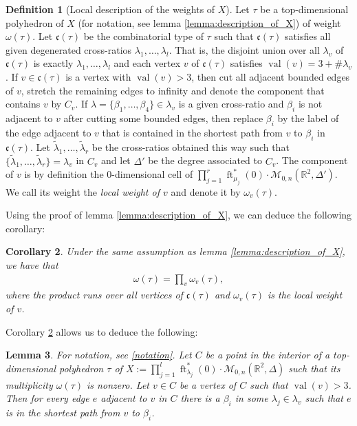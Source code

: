 \documentclass[11pt,reqno,a4]{amsart}
\theoremstyle{dotless}
\newtheorem{corollary}{Corollary}[section]
\newtheorem{lemma}[corollary]{Lemma}
\theoremstyle{definition}
\newtheorem{definition}[corollary]{Definition}
\newcommand{\ft}{\operatorname{ft}}
\newcommand{\val}{\operatorname{val}}
\begin{document}
\begin{definition}[Local description of the weights of $X$]\label{definition:resolution_weights_local}
Let $\tau$ be a top-dimensional polyhedron of $X$ (for notation, see lemma \ref{lemma:description_of_X}) of weight $\omega(\tau)$. Let $\mathfrak{c}(\tau)$ be the combinatorial type of $\tau$ such that $\mathfrak{c}(\tau)$ satisfies all given degenerated cross-ratios $\lambda_1,\dots,\lambda_l$. That is, the disjoint union over all $\lambda_v$ of $\mathfrak{c}(\tau)$ is exactly $\lambda_1,\dots,\lambda_l$ and each vertex $v$ of $\mathfrak{c}(\tau)$ satisfies $\val(v)=3+\#\lambda_v$. If $v\in\mathfrak{c}(\tau)$ is a vertex with $\val(v)>3$, then cut all adjacent bounded edges of $v$, stretch the remaining edges to infinity and denote the component that contains $v$ by $C_v$. If $\lambda=\lbrace \beta_1,\dots,\beta_4\rbrace\in\lambda_v$ is a given cross-ratio and $\beta_i$ is not adjacent to $v$ after cutting some bounded edges, then replace $\beta_i$ by the label of the edge adjacent to $v$ that is contained in the shortest path from $v$ to $\beta_i$ in $\mathfrak{c}(\tau)$. Let $\tilde{\lambda}_1,\dots,\tilde{\lambda}_r$ be the cross-ratios obtained this way such that $\lbrace \tilde{\lambda}_1,\dots,\tilde{\lambda}_r\rbrace=\lambda_v$ in $C_v$ and let $\Delta'$ be the degree associated to $C_v$. The component of $v$ is by definition the $0$-dimensional cell of $\prod_{j=1}^r \ft_{\mu_j}^*\left( 0\right)\cdot\mathcal{M}_{0,n}\left(\mathbb{R}^2,\Delta' \right)$. We call its weight the \textit{local weight of $v$} and denote it by $\omega_v(\tau)$. 
\end{definition}

Using the proof of lemma \ref{lemma:description_of_X}, we can deduce the following corollary:
\begin{corollary}\label{corollary:resolution_weights_local}
Under the same assumption as lemma \ref{lemma:description_of_X}, we have that
\begin{align*}
\omega(\tau)=\prod_v \omega_v(\tau),
\end{align*}
where the product runs over all vertices of $\mathfrak{c}(\tau)$ and $\omega_v(\tau)$ is the local weight of $v$.
\end{corollary}

Corollary \ref{corollary:resolution_weights_local} allows us to deduce the following:

\begin{lemma}\label{lemma:nice_property}
For notation, see \ref{notation}. Let $C$ be a point in the interior of a top-dimensional polyhedron $\tau$ of $X:=\prod_{j=1}^{l}\ft_{\lambda_j}^*\left( 0\right)\cdot\mathcal{M}_{0,n}\left(\mathbb{R}^2,\Delta \right)$ such that its multiplicity $\omega(\tau)$ is nonzero. Let $v\in C$ be a vertex of $C$ such that $\val(v)>3$. Then for every edge $e$ adjacent to $v$ in $C$ there is a $\beta_i$ in some $\lambda_j\in\lambda_v$ such that $e$ is in the shortest path from $v$ to $\beta_i$. 
\end{lemma}
\end{document}
